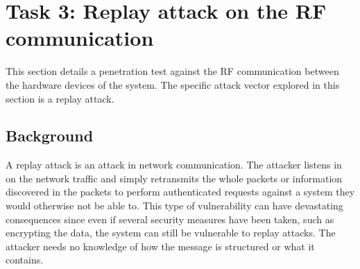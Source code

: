 \section{Task 3: Replay attack on the RF communication} \label{ch:pentesting:replay}
This section details a penetration test against the RF communication between the hardware devices of the system. The specific attack vector explored in this section is a replay attack.

\subsection{Background}
A replay attack is an attack in network communication. The attacker listens in on the network traffic and simply retransmits the whole packets or information discovered in the packets to perform authenticated requests against a system they would otherwise not be able to. This type of vulnerability can have devastating consequences since even if several security measures have been taken, such as encrypting the data, the system can still be vulnerable to replay attacks. The attacker needs no knowledge of how the message is structured or what it contains.

